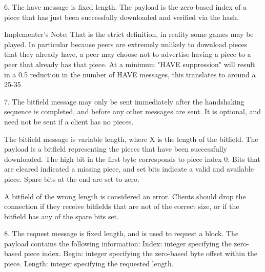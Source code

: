 \documentclass[11pt]{article}
\begin{document}
  \begin{flushleft}

    6. The have message is fixed length. The payload is the zero-based index of a piece that has just been successfully downloaded and verified via the hash.

  \end{flushleft}
  \begin{flushleft}

    Implementer's Note: That is the strict definition, in reality some games may be played. In particular because peers are extremely unlikely to download pieces that they already have, a peer may choose not to advertise having a piece to a peer that already has that piece. At a minimum "HAVE suppression" will result in a 0.5 reduction in the number of HAVE messages, this translates to around a 25-35%

  \end{flushleft}
  \begin{flushleft}

    7. The bitfield message may only be sent immediately after the handshaking sequence is completed, and before any other messages are sent. It is optional, and need not be sent if a client has no pieces.

  \end{flushleft}
  \begin{flushleft}

    The bitfield message is variable length, where X is the length of the bitfield. The payload is a bitfield representing the pieces that have been successfully downloaded. The high bit in the first byte corresponds to piece index 0. Bits that are cleared indicated a missing piece, and set bits indicate a valid and available piece. Spare bits at the end are set to zero.

  \end{flushleft}
  \begin{flushleft}

    A bitfield of the wrong length is considered an error. Clients should drop the connection if they receive bitfields that are not of the correct size, or if the bitfield has any of the spare bits set.

  \end{flushleft}
  \begin{flushleft}

    8. The request message is fixed length, and is used to request a block. The payload contains the following information: Index: integer specifying the zero-based piece index. Begin: integer specifying the zero-based byte offset within the piece. Length: integer specifying the requested length.

  \end{flushleft}
\end{document}
